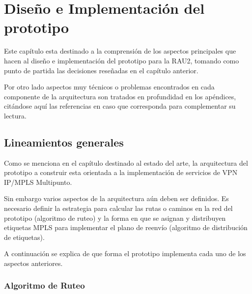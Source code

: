 \chapter{Dise\~no e Implementaci\'on del prototipo}

\ifpdf
    \graphicspath{{Chapter4/Figs/Raster/}{Chapter4/Figs/PDF/}{Chapter4/Figs/}}
\else
    \graphicspath{{Chapter4/Figs/Vector/}{Chapter4/Figs/}}
\fi

Este cap\'itulo esta destinado a la comprensi\'on de los aspectos principales que hacen al dise\~no e implementaci\'on del prototipo para la RAU2, tomando como punto de partida las decisiones reseñadas en el cap\'itulo anterior.


Por otro lado aspectos muy t\'ecnicos o problemas encontrados en cada componente de la arquitectura son tratados en profundidad en los ap\'endices, citándose aquí las referencias en caso que corresponda para complementar su lectura.\\

\section[Lineamientos generales]{Lineamientos generales}

Como se menciona en el cap\'itulo destinado al estado del arte, la arquitectura del prototipo a construir esta orientada a la implementaci\'on de servicios de VPN IP/MPLS Multipunto.

Sin embargo varios aspectos de la arquitectura a\'un deben ser definidos. Es necesario definir la estrategia para calcular las rutas o caminos en la red del prototipo (algoritmo de ruteo) y la forma en que se asignan y distribuyen etiquetas MPLS para implementar el plano de reenvío (algoritmo de distribución de etiquetas). 

A continuaci\'on se explica de que forma el prototipo implementa cada uno de los aspectos anteriores.

\subsection{Algoritmo de Ruteo}

